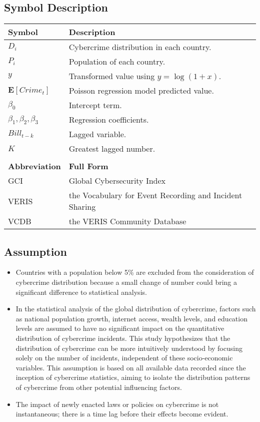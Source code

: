 \subsection{Symbol Description}\label{subsec:symbol-description} %
\begin{tabular}{ll}
    \textbf{Symbol} & \textbf{Description} \\
    \hline
    $D_i$                     & Cybercrime distribution in each country. \\
    $P_i$                     & Population of each country. \\
    $y$                       & Transformed value using \( y = \log(1 + x) \). \\
    $\mathbf{E}[Crime_t]$     & Poisson regression model predicted value. \\
    $\beta_0$                 & Intercept term. \\
    $\beta_1,\beta_2,\beta_3$ & Regression coefficients. \\
    $Bill_{t-k}$              & Lagged variable. \\
    $K$                       & Greatest lagged number. \\
     & \\
    \textbf{Abbreviation} & \textbf{Full Form} \\
    \hline
    GCI   & Global Cybersecurity Index\cite{gci-2024} \\
    VERIS & the Vocabulary for Event Recording and Incident Sharing\cite{veris} \\
    VCDB  & the VERIS Community Database\cite{vcdb} \\
\end{tabular}
\subsection{Assumption}\label{subsec:assumption} %
\begin{itemize}
    \item Countries with a population below 5\% are excluded from the consideration of cybercrime distribution because
        a small change of number could bring a significant difference to statistical analysis.
    \item In the statistical analysis of the global distribution of cybercrime,
        factors such as national population growth, internet access, wealth levels, and education levels
        are assumed to have no significant impact on the quantitative distribution of cybercrime incidents.
        This study hypothesizes that the distribution of cybercrime can be more intuitively understood by focusing solely on the number of incidents,
        independent of these socio-economic variables.
        This assumption is based on all available data recorded since the inception of cybercrime statistics,
        aiming to isolate the distribution patterns of cybercrime from other potential influencing factors.
    \item The impact of newly enacted laws or policies on cybercrime is not instantaneous;
        there is a time lag before their effects become evident.
\end{itemize}
